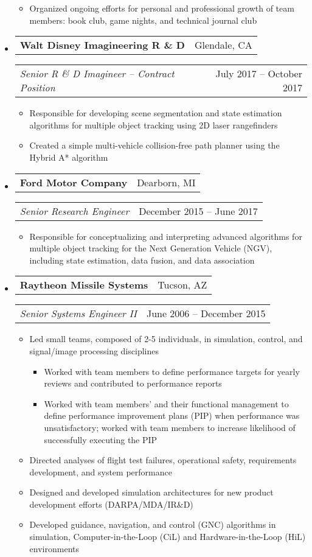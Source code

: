 \documentclass[letterpaper,18pt]{article}
\makeatletter
\newcommand{\resitem}[1]{\item #1 \vspace{-2pt}}
\newcommand{\headerrow}[2]{%
  \hspace*{-\labelsep}%
  \begin{tabular*}{\dimexpr\linewidth+\labelsep}{@{\extracolsep{\fill}}lr@{}}
    #1 &
    #2 \\
  \end{tabular*}%
}
\makeatother
\begin{document}
\begin{itemize}[label={},leftmargin=*,noitemsep]
{\begin{itemize}[noitemsep]
        \resitem{Organized ongoing efforts for personal and professional growth of team members: book club, game nights, and technical journal club}  
	\end{itemize}
	}
\newpage
\item
	\headerrow{\textbf{Walt Disney Imagineering R \& D}}{Glendale, CA}
	\headerrow{\emph{Senior R \& D Imagineer -- Contract Position}}{July 2017 -- October 2017}
	{\small
	\begin{itemize}[noitemsep]
		\resitem{Responsible for developing scene segmentation and state estimation algorithms for multiple object tracking using 2D laser rangefinders}
        \resitem{Created a simple multi-vehicle collision-free path planner using the Hybrid A* algorithm}
	\end{itemize}
	}
\item
	\headerrow{\textbf{Ford Motor Company}}{Dearborn, MI}
	\headerrow{\emph{Senior Research Engineer}}{December 2015 -- June 2017}
	{\small
	\begin{itemize}[noitemsep]
		\resitem{Responsible for conceptualizing and interpreting advanced algorithms for multiple object tracking for the Next Generation Vehicle (NGV), including state estimation, data fusion, and data association}
	\end{itemize}
        }
\item
	\headerrow{\textbf{Raytheon Missile Systems}}{Tucson, AZ}
	\headerrow{\emph{Senior Systems Engineer II}}{June 2006 -- December 2015}
	{\small
	\begin{itemize}[noitemsep]
     \resitem{Led small teams, composed of 2-5 individuals, in simulation, control, and signal/image processing disciplines}
        \begin{itemize}[noitemsep]
                \resitem{Worked with team members to define performance targets for yearly reviews and contributed to performance reports}
                \resitem{Worked with team members' and their functional management to define performance improvement plans (PIP) when performance was unsatisfactory; worked with team members to increase likelihood of successfully executing the PIP}
        \end{itemize}
	 \resitem{Directed analyses of flight test failures, operational safety, requirements development, and system performance}
      \resitem{Designed and developed simulation architectures for new product development efforts (DARPA/MDA/IR\&D)}
	  \resitem{Developed guidance, navigation, and control (GNC) algorithms in simulation, Computer-in-the-Loop (CiL) and Hardware-in-the-Loop (HiL) environments}
	\end{itemize}
	}
\end{itemize}
\end{document}
